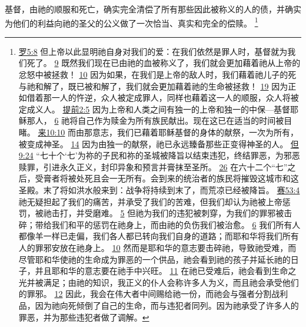 \documentclass[12pt, a4paper, oneside]{ctexart}
\newcounter{parnum}[section]
\newcommand{\N}{%
   \noindent\refstepcounter{parnum}%
    \makebox[\parindent][l]{\textbf{\arabic{parnum}.}}}
\begin{document}
\N 基督，由祂的顺服和死亡，确实完全清偿了所有那些因此被称义的人的债，并确实为他们的利益向祂的圣父的公义做了一次恰当、真实和完全的偿赎。
	\footnote {
		\href{https://biblehub.com/romans/5-8.htm}{罗5:8} 但上帝以此显明祂自身对我们的爱：在我们依然是罪人时，基督就为我们死了。
		\href{https://biblehub.com/romans/5-9.htm}{9} 既然我们现在已由祂的血被称义了，我们就会更加藉着祂从上帝的忿怒中被拯救！
		\href{https://biblehub.com/romans/5-10.htm}{10} 因为如果，在我们是上帝的敌人时，我们藉着祂儿子的死与祂和解了，既已被和解了，我们就会更加藉着祂的生命被拯救！
		\href{https://biblehub.com/romans/5-19.htm}{19} 因为正如借着那一人的忤逆，众人被定成罪人，同样也藉着这一人的顺服，众人将被定成义人。
		\href{https://biblehub.com/1_timothy/2-5.htm}{提前2:5} 因为上帝和人类之间有独一的上帝和独一的中保---基督耶稣那人，
		\href{https://biblehub.com/1_timothy/2-6.htm}{6} 祂将自己作为赎金为所有族民献出。现在这已在适当的时间被目睹。
		\href{https://biblehub.com/hebrews/10-10.htm}{来10:10} 而由那意志，我们已藉着耶稣基督的身体的献祭，一次为所有，被变成神圣。
		\href{https://biblehub.com/hebrews/10-14.htm}{14} 因为由独一的献祭，祂已永远臻备那些正变得神圣的人。
		\href{https://biblehub.com/daniel/9-24.htm}{但9:24} “七十个‘七’为祢的子民和祢的圣城被降旨以结束违犯，终结罪恶，为邪恶赎罪，引进永久正义，封印异象和预言并膏抹至圣所。
		\href{https://biblehub.com/daniel/9-26.htm}{26} 在六十二个“七”之后，受膏者将被处死且会一无所有。会到来的统治者的族民将摧毁这城市和这圣殿。末了将如洪水般来到：战争将持续到末了，而荒凉已经被降旨。
		\href{https://biblehub.com/isaiah/53-4.htm}{赛53:4} 祂无疑担起了我们的痛苦，并承受了我们的苦难，但我们却认为祂被上帝惩罚，被祂击打，并受磨难。
		\href{https://biblehub.com/isaiah/53-5.htm}{5} 但祂为我们的违犯被刺穿，为我们的罪邪被击碎；带给我们和平的惩罚在祂身上，而由祂的负伤我们被治愈。
		\href{https://biblehub.com/isaiah/53-6.htm}{6} 我们所有人都像羊一样已走偏，我们各人都已转向我们自身的道路；而耶和华将我们所有人的罪邪安放在祂身上。
		\href{https://biblehub.com/isaiah/53-10.htm}{10} 然而是耶和华的意志要击碎祂，导致祂受难，而尽管耶和华使祂的生命成为罪恶的一个供品，祂会看到祂的孩子并延长祂的日子，并且耶和华的意志要在祂手中兴旺。
		\href{https://biblehub.com/isaiah/53-11.htm}{11} 在祂已受难后，祂会看到生命之光并被满足；由祂的知识，我正义的仆人会称许多人为义，而且祂会承受他们的罪邪。
		\href{https://biblehub.com/isaiah/53-12.htm}{12} 因此，我会在伟大者中间赐给祂一份，而祂会与强者分割战利品，因为祂向死倾倒了自己的生命，而与违犯者同列。因为祂承受了许多人的罪恶，并为那些违犯者做了调解。
	}
\end{document}
